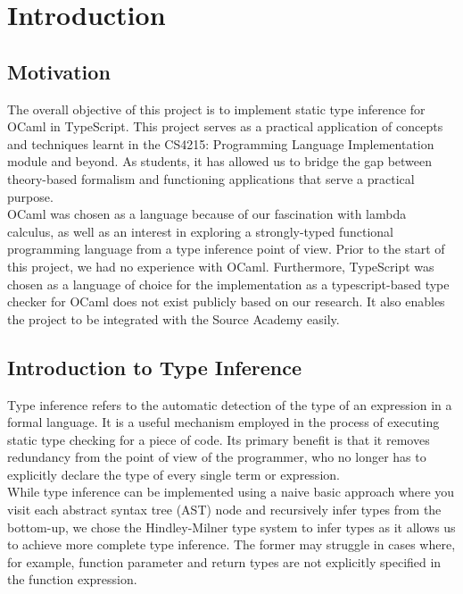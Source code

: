 \section{Introduction}


\subsection{Motivation}
The overall objective of this project is to implement static type inference for OCaml in TypeScript. This project serves as a practical application of concepts and techniques learnt in the CS4215: Programming Language Implementation module and beyond. As students, it has allowed us to bridge the gap between theory-based formalism and functioning applications that serve a practical purpose. \\

OCaml was chosen as a language because of our fascination with lambda calculus, as well as an interest in exploring a strongly-typed functional programming language from a type inference point of view. Prior to the start of this project, we had no experience with OCaml. Furthermore, TypeScript was chosen as a language of choice for the implementation as a typescript-based type checker for OCaml does not exist publicly based on our research. It also enables the project to be integrated with the Source Academy easily.

\subsection{Introduction to Type Inference}
Type inference refers to the automatic detection of the type of an expression in a formal language. It is a useful mechanism employed in the process of executing static type checking for a piece of code. Its primary benefit is that it removes redundancy from the point of view of the programmer, who no longer has to explicitly declare the type of every single term or expression. \\

While type inference can be implemented using a naive basic approach where you visit each abstract syntax tree (AST) node and recursively infer types from the bottom-up, we chose the Hindley-Milner type system to infer types as it allows us to achieve more complete type inference. The former may struggle in cases where, for example, function parameter and return types are not explicitly specified in the function expression.

